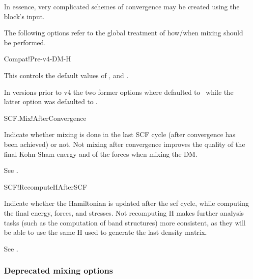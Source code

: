 In essence, very complicated schemes of convergence may be created
using the block's input.

The following options refer to the global treatment of how/when mixing
should be performed.


\begin{fdflogicalF}{Compat!Pre-v4-DM-H}

  This controls the default values of ,
   and .
  
  In versions prior to v4 the two former options where defaulted to
  \fdftrue\ while the latter option was defaulted to \fdffalse.
  
\end{fdflogicalF}

\begin{fdflogicalF}{SCF.Mix!AfterConvergence}

  Indicate whether mixing is done in the last SCF cycle (after
  convergence has been achieved) or not. Not mixing after convergence
  improves the quality of the final Kohn-Sham energy and of the forces
  when mixing the DM.

  \note See .

\end{fdflogicalF}

\begin{fdflogicalF}{SCF!RecomputeHAfterSCF}
  
  Indicate whether the Hamiltonian is updated after the scf cycle,
  while computing the final energy, forces, and stresses. Not
  recomputing H makes further analysis tasks (such as the computation
  of band structures) more consistent, as they will be able to use the
  same H used to generate the last density matrix.
  
  \note See .

\end{fdflogicalF}


\ifdeprecated
\subsubsection{Deprecated mixing options}

